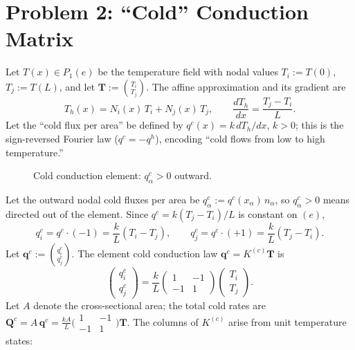 \documentclass[11pt, a4paper]{article}
\begin{document}
\section{Problem 2: ``Cold'' Conduction Matrix}

Let $T(x)\in P_1(e)$ be the temperature field with nodal values $T_i:=T(0)$, $T_j:=T(L)$, and let $\mathbf{T}:=\binom{T_i}{T_j}$.  The affine approximation and its gradient are
\[
T_h(x)=N_i(x)\,T_i+N_j(x)\,T_j,\qquad
\frac{dT_h}{dx}=\frac{T_j-T_i}{L}.
\]
Let the ``cold flux per area'' be defined by $q^c(x)=k\,dT_h/dx$, $k>0$; this is the sign-reversed Fourier law ($q^c=-q^h$), encoding ``cold flows from low to high temperature.''

\begin{figure}[H]
\centering
{}
\caption{Cold conduction element: $q^c_\alpha>0$ outward.}
\label{fig:cold}
\end{figure}

Let the outward nodal cold fluxes per area be $q^c_\alpha:= q^c(x_\alpha)\,n_\alpha$, so $q^c_\alpha>0$ means directed out of the element.  Since $q^c=k(T_j-T_i)/L$ is constant on $(e)$,
\[
q_i^c=q^c\!\cdot\!(-1)=\frac{k}{L}(T_i-T_j),\qquad
q_j^c=q^c\!\cdot\!(+1)=\frac{k}{L}(T_j-T_i).
\]
Let $\mathbf{q}^c:=\binom{q^c_i}{q^c_j}$.  The element cold conduction law $\mathbf{q}^c=K^{(c)}\mathbf{T}$ is
\[
\boxed{
\begin{pmatrix} q_i^c\\[2pt] q_j^c\end{pmatrix}
=\frac{k}{L}
\begin{pmatrix} 1 & -1\\[2pt] -1 & 1\end{pmatrix}
\begin{pmatrix} T_i\\[2pt] T_j\end{pmatrix}.
}
\]
Let $A$ denote the cross-sectional area; the total cold rates are $\mathbf{Q}^c=A\,\mathbf{q}^c=\frac{kA}{L}\bigl(\begin{smallmatrix}1&-1\\-1&1\end{smallmatrix}\bigr)\mathbf{T}$.  The columns of $K^{(c)}$ arise from unit temperature states:
\end{document}
